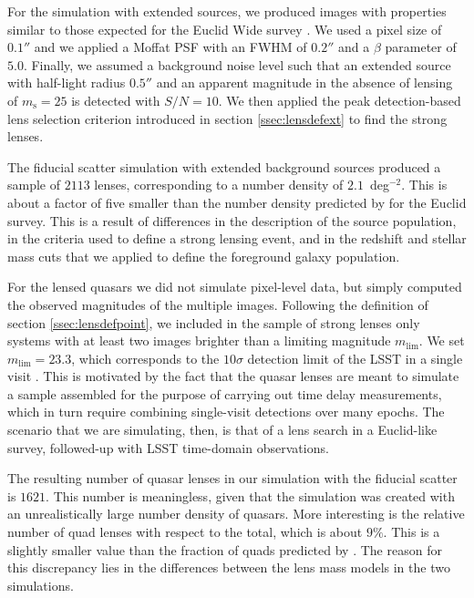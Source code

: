 \documentclass{aa}
\def\msource{m_{\mathrm{s}}}
\begin{document}

For the simulation with extended sources, we produced images with properties similar to those expected for the Euclid Wide survey \citep{Sca++22}.
We used a pixel size of $0.1''$ and we applied a Moffat PSF with an FWHM of $0.2''$ and a $\beta$ parameter of $5.0$.
Finally, we assumed a background noise level such that an extended source with half-light radius $0.5''$ and an apparent magnitude in the absence of lensing of $\msource=25$ is detected with $S/N=10$.
We then applied the peak detection-based lens selection criterion introduced in section \ref{ssec:lensdefext} to find the strong lenses.

The fiducial scatter simulation with extended background sources produced a sample of $2113$ lenses, corresponding to a number density of $2.1$~deg$^{-2}$. This is about a factor of five smaller than the number density predicted by \citet{Col15} for the Euclid survey. This is a result of differences in the description of the source population, in the criteria used to define a strong lensing event, and in the redshift and stellar mass cuts that we applied to define the foreground galaxy population.

For the lensed quasars we did not simulate pixel-level data, but simply computed the observed magnitudes of the multiple images.
Following the definition of section \ref{ssec:lensdefpoint}, we included in the sample of strong lenses only systems with at least two images brighter than a limiting magnitude $m_{\mathrm{lim}}$.
We set $m_{\mathrm{lim}}=23.3$, which corresponds to the $10\sigma$ detection limit of the LSST in a single visit \citep{O+M10}. This is motivated by the fact that the quasar lenses are meant to simulate a sample assembled for the purpose of carrying out time delay measurements, which in turn require combining single-visit detections over many epochs.
The scenario that we are simulating, then, is that of a lens search in a Euclid-like survey, followed-up with LSST time-domain observations.

The resulting number of quasar lenses in our simulation with the fiducial scatter is $1621$. This number is meaningless, given that the simulation was created with an unrealistically large number density of quasars.
More interesting is the relative number of quad lenses with respect to the total, which is about $9\%$. This is a slightly smaller value than the fraction of quads predicted by \citet{O+M10}.
The reason for this discrepancy lies in the differences between the lens mass models in the two simulations.
\end{document}
